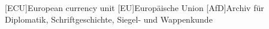 
\begin{acronym}

[ECU]{European currency unit}
[EU]{Europäische Union}
[AfD]{Archiv für Diplomatik, Schriftgeschichte, Siegel- und Wappenkunde}
\end{acronym}
